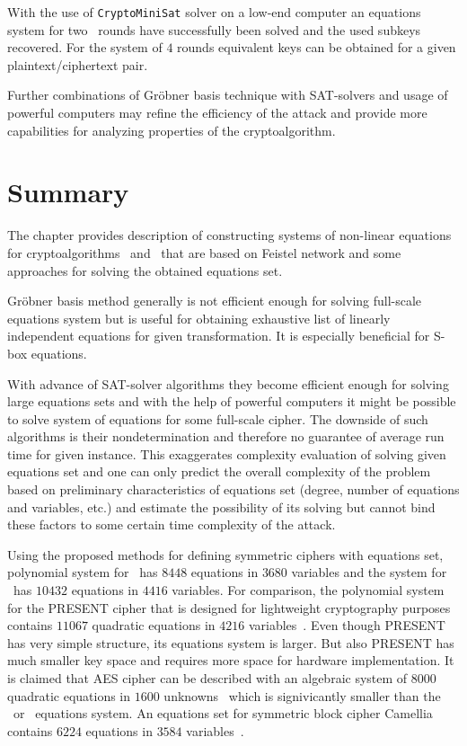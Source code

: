 With the use of \verb+CryptoMiniSat+ solver on a low-end computer an equations
system for two \misty\ rounds have successfully been solved and the used subkeys
recovered. For the system of $4$ rounds equivalent keys can be obtained for a
given \mbox{plaintext/ciphertext} pair.

Further combinations of Gr\"obner basis technique with SAT-solvers and
usage of powerful computers may refine the efficiency of the attack and provide
more capabilities for analyzing properties of the cryptoalgorithm.


\section{Summary}

The chapter provides description of constructing systems of non-linear equations
for cryptoalgorithms \gost\ and \misty\ that are based on Feistel network and
some approaches for solving the obtained equations set.

Gr\"obner basis method generally is not efficient enough for solving full-scale
equations system but is useful for obtaining exhaustive list of linearly
independent equations for given transformation. It is especially beneficial for
S-box equations.

With advance of SAT-solver algorithms they become efficient enough for solving
large equations sets and with the help of powerful computers it might be
possible to solve system of equations for some full-scale cipher. The downside
of such algorithms is their nondetermination and therefore no guarantee of
average run time for given instance. This exaggerates complexity evaluation of
solving given equations set and one can only predict the overall complexity of
the problem based on preliminary characteristics of equations set (degree,
number of equations and variables, etc.) and estimate the possibility of its
solving but cannot bind these factors to some certain time complexity of the
attack.

Using the proposed methods for defining symmetric ciphers with equations set,
polynomial system for \misty\ has $8448$ equations in $3680$ variables
and the system for \gost\ has $10432$ equations in $4416$ variables.
For comparison, the polynomial system for the PRESENT cipher that is
designed for lightweight cryptography purposes contains $11067$ quadratic
equations in $4216$ variables~\cite{ches:present:2007}. Even though PRESENT has
very simple structure, its equations system is larger. But also PRESENT has much
smaller key space and requires more space for hardware implementation. It is
claimed that AES cipher can be described with an algebraic system of $8000$
quadratic equations in $1600$ unknowns~\cite{cid2006algebraic} which is
signivicantly smaller than the \gost\ or \misty\ equations system. An equations
set for symmetric block cipher Camellia contains $6224$ equations in $3584$
variables~\cite{Biryukov03blockciphers}.


